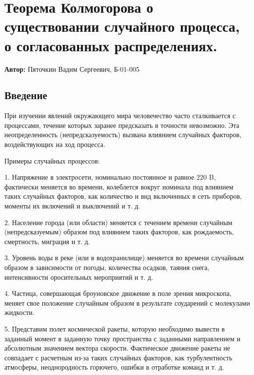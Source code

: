 


\section{Теорема Колмогорова о существовании случайного процесса, о согласованных распределениях.}

\textbf{Автор:} Пяточкин Вадим Сергеевич, Б-01-005

\subsection{Введение}

При изучении явлений окружающего мира человечество часто сталкивается с процессами, течение которых заранее предсказать в точности невозможно. Эта неопределенность (непредсказуемость) вызвана влиянием случайных факторов, воздействующих на ход процесса.
 
Примеры случайных процессов:

1. Напряжение в электросети, номинально постоянное и равное 220 B, фактически меняется во времени, колеблется вокруг номинала под влиянием таких случайных факторов, как количество и вид включенных в сеть приборов, моменты их включений и выключений и т. д.

2. Население города (или области) меняется с течением времени случайным (непредсказуемым) образом под влиянием таких факторов, как рождаемость, смертность, миграция и т. д.

3. Уровень воды в реке (или в водохранилище) меняется во времени случайным образом в зависимости от погоды, количества осадков, таяния снега, интенсивности оросительных мероприятий и т. д.

4. Частица, совершающая броуновское движение в поле зрения микроскопа, меняет свое положение случайным образом в результате соударений с молекулами жидкости.

5. Представим полет космической ракеты, которую необходимо вывести в заданный момент в заданную точку пространства с заданными направлением и абсолютным значением вектора скорости. Фактическое движение ракеты не совпадает с расчетным из-за таких случайных факторов, как турбулентность атмосферы, неоднородность горючего, ошибки в отработке команд и т. д.

